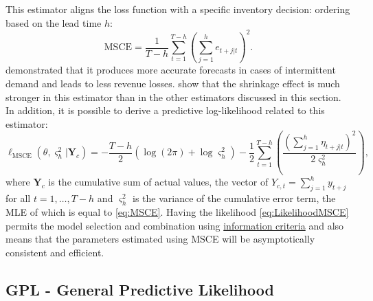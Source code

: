 \documentclass[
]{book}
\theoremstyle{definition}
\theoremstyle{definition}
\theoremstyle{definition}
\theoremstyle{definition}
\theoremstyle{remark}
\begin{document}
This estimator aligns the loss function with a specific inventory decision: ordering based on the lead time \(h\):
\begin{equation}
    \mathrm{MSCE} = \frac{1}{T-h} \sum_{t=1}^{T-h} \left( \sum_{j=1}^h e_{t+j|t} \right)^2 .
  \label{eq:MSCE}
\end{equation}
\citet{kourentzes2019unconstraining} demonstrated that it produces more accurate forecasts in cases of intermittent demand and leads to less revenue losses. \citet{Svetunkov2020Multistep} show that the shrinkage effect is much stronger in this estimator than in the other estimators discussed in this section. In addition, it is possible to derive a predictive log-likelihood related to this estimator:
\begin{equation}
    \ell_{\mathrm{MSCE}}(\theta, {\varsigma^2_h} | \mathbf{Y}_c) = -\frac{T-h}{2} \left( \log(2 \pi) + \log {\varsigma^2_h} \right) -\frac{1}{2} \sum_{t=1}^{T-h} \left( \frac{\left(\sum_{j=1}^h \eta_{t+j|t}\right)^2}{2 {\varsigma^2_h}} \right) ,
  \label{eq:LikelihoodMSCE}
\end{equation}
where \(\mathbf{Y}_c\) is the cumulative sum of actual values, the vector of \(Y_{c,t}=\sum_{j=1}^h y_{t+j}\) for all \(t=1, \ldots, T-h\) and \({\varsigma^2_h}\) is the variance of the cumulative error term, the MLE of which is equal to \eqref{eq:MSCE}. Having the likelihood \eqref{eq:LikelihoodMSCE} permits the model selection and combination using \protect\hyperlink{modelSelection}{information criteria} and also means that the parameters estimated using MSCE will be asymptotically consistent and efficient.

\hypertarget{gpl---general-predictive-likelihood}{%
\subsection{GPL - General Predictive Likelihood}\label{gpl---general-predictive-likelihood}}
\end{document}
